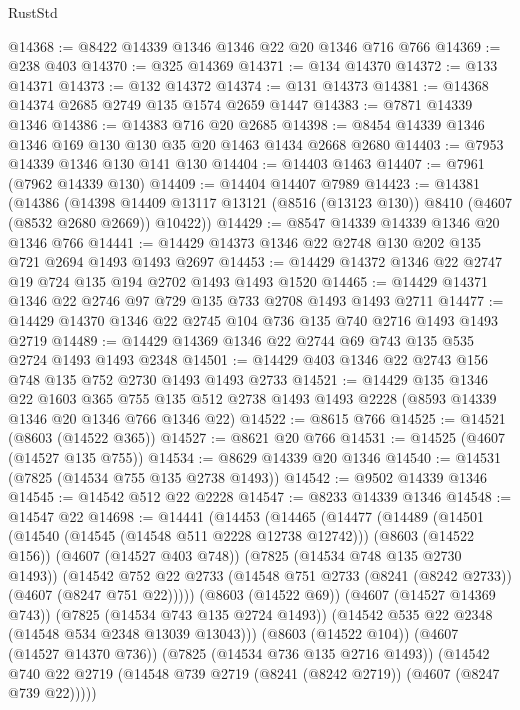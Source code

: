 \begin{lexlean}{RustStd}
\begin{coremodule}
@14368 := @8422 @14339 @1346 @1346 @22 @20 @1346 @716 @766
@14369 := @238 @403
@14370 := @325 @14369
@14371 := @134 @14370
@14372 := @133 @14371
@14373 := @132 @14372
@14374 := @131 @14373
@14381 := @14368 @14374 @2685 @2749 @135 @1574 @2659 @1447
@14383 := @7871 @14339 @1346
@14386 := @14383 @716 @20 @2685
@14398 := @8454 @14339 @1346 @1346 @169 @130 @130 @35 @20 @1463 @1434 @2668 @2680
@14403 := @7953 @14339 @1346 @130 @141 @130
@14404 := @14403 @1463
@14407 := @7961 (@7962 @14339 @130)
@14409 := @14404 @14407 @7989
@14423 := @14381
    (@14386
      (@14398 @14409 @13117 @13121 (@8516 (@13123 @130)) @8410 (@4607 (@8532 @2680 @2669)) @10422))
@14429 := @8547 @14339 @14339 @1346 @20 @1346 @766
@14441 := @14429 @14373 @1346 @22 @2748 @130 @202 @135 @721 @2694 @1493 @1493 @2697
@14453 := @14429 @14372 @1346 @22 @2747 @19 @724 @135 @194 @2702 @1493 @1493 @1520
@14465 := @14429 @14371 @1346 @22 @2746 @97 @729 @135 @733 @2708 @1493 @1493 @2711
@14477 := @14429 @14370 @1346 @22 @2745 @104 @736 @135 @740 @2716 @1493 @1493 @2719
@14489 := @14429 @14369 @1346 @22 @2744 @69 @743 @135 @535 @2724 @1493 @1493 @2348
@14501 := @14429 @403 @1346 @22 @2743 @156 @748 @135 @752 @2730 @1493 @1493 @2733
@14521 := @14429
    @135
    @1346
    @22
    @1603
    @365
    @755
    @135
    @512
    @2738
    @1493
    @1493
    @2228
    (@8593 @14339 @1346 @20 @1346 @766 @1346 @22)
@14522 := @8615 @766
@14525 := @14521 (@8603 (@14522 @365))
@14527 := @8621 @20 @766
@14531 := @14525 (@4607 (@14527 @135 @755))
@14534 := @8629 @14339 @20 @1346
@14540 := @14531 (@7825 (@14534 @755 @135 @2738 @1493))
@14542 := @9502 @14339 @1346
@14545 := @14542 @512 @22 @2228
@14547 := @8233 @14339 @1346
@14548 := @14547 @22
@14698 := @14441
    (@14453
      (@14465
        (@14477
          (@14489
            (@14501
              (@14540 (@14545 (@14548 @511 @2228 @12738 @12742)))
              (@8603 (@14522 @156))
              (@4607 (@14527 @403 @748))
              (@7825 (@14534 @748 @135 @2730 @1493))
              (@14542
                @752
                @22
                @2733
                (@14548 @751 @2733 (@8241 (@8242 @2733)) (@4607 (@8247 @751 @22)))))
            (@8603 (@14522 @69))
            (@4607 (@14527 @14369 @743))
            (@7825 (@14534 @743 @135 @2724 @1493))
            (@14542 @535 @22 @2348 (@14548 @534 @2348 @13039 @13043)))
          (@8603 (@14522 @104))
          (@4607 (@14527 @14370 @736))
          (@7825 (@14534 @736 @135 @2716 @1493))
          (@14542
            @740
            @22
            @2719
            (@14548 @739 @2719 (@8241 (@8242 @2719)) (@4607 (@8247 @739 @22)))))

\end{coremodule}
\end{lexlean}
